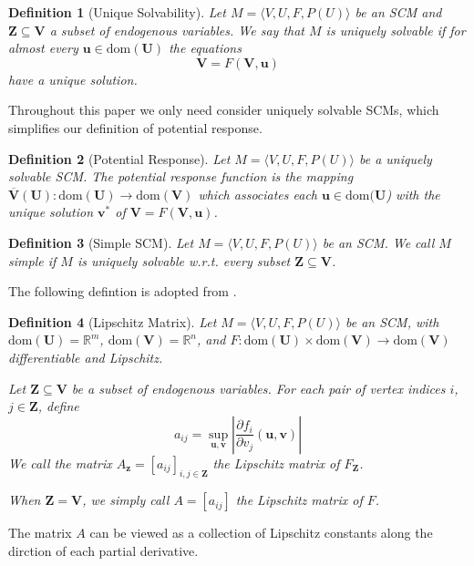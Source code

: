\documentclass{article}
\newtheorem{definition}{Definition}
\newcommand\R{\mathbb{R}}
\begin{document}
\begin{definition}[Unique Solvability]
Let $M=\langle V,U,F,P(U)\rangle$ be an SCM and $\mathbf{Z}\subseteq\mathbf{V}$ a subset of endogenous variables. We say that $M$ is uniquely solvable if for almost every $\mathbf{u}\in\text{dom}(\mathbf{U})$ the equations
\[
\mathbf{V} = F(\mathbf{V},\mathbf{u})
\]
have a unique solution.
\end{definition}

Throughout this paper we only need consider uniquely solvable SCMs, which simplifies our definition of potential response.

\begin{definition}[Potential Response]
Let $M=\langle V,U,F,P(U)\rangle$ be a uniquely solvable SCM. 
The potential response function is the mapping $\overline{\mathbf{V}}(\mathbf{U}):\text{dom}(\mathbf{U})\to\text{dom}(\mathbf{V})$ which associates each $\mathbf{u}\in\text{dom}(\mathbf{U}$) with the unique solution $\mathbf{v}^*$ of $\mathbf{V} = F(\mathbf{V},\mathbf{u})$.
\end{definition}


\begin{definition}[Simple SCM]
Let $M=\langle V,U,F,P(U)\rangle$ be an SCM. 
We call $M$ simple if $M$ is uniquely solvable w.r.t. every subset $\mathbf{Z}\subseteq\mathbf{V}$.
\end{definition}

The following defintion is adopted from \cite{ReberIntrinsic}.
\begin{definition}[Lipschitz Matrix]
Let $M=\langle V,U,F,P(U)\rangle$ be an SCM, with $\text{dom}(\mathbf{U})=\R^m$, $\text{dom}(\mathbf{V})=\R^n$, and $F:\text{dom}(\mathbf{U})\times \text{dom}(\mathbf{V})\to\text{dom}(\mathbf{V})$ differentiable and Lipschitz.

Let $\mathbf{Z}\subseteq\mathbf{V}$ be a subset of endogenous variables.
For each pair of vertex indices $i$, $j\in\mathbf{Z}$, define
\[
a_{ij} = \sup_{\mathbf{u},\mathbf{v}} \left\lvert\frac{\partial f_i}{\partial v_j}(\mathbf{u},\mathbf{v})\right\rvert
\]
We call the matrix $A_{\mathbf{z}}=[a_{ij}]_{i,j\in\mathbf{Z}}$ the Lipschitz matrix of $F_\mathbf{Z}$.

When $\mathbf{Z}=\mathbf{V}$, we simply call $A=[a_{ij}]$ the Lipschitz matrix of $F$.
\end{definition}

The matrix $A$ can be viewed as a collection of Lipschitz constants along the dirction of each partial derivative.
\end{document}
